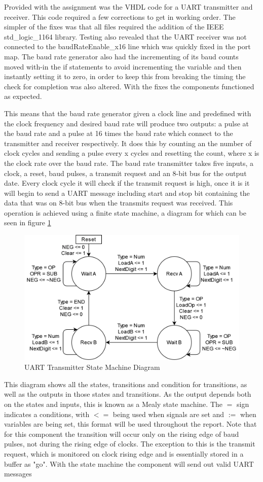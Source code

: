 \documentclass[11pt]{article}
\begin{document}
Provided with the assignment was the VHDL code for a UART transmitter and receiver. 
This code required a few corrections to get in working order. 
The simpler of the fixes was that all files required the addition of the IEEE std\_logic\_1164 library. 
Testing also revealed that the UART receiver was not connected to the baudRateEnable\_x16 line which was quickly fixed in the port map.
The baud rate generator also had the incrementing of its baud counts moved with-in the if statements to avoid incrementing the variable and then instantly setting it to zero, in order to keep this from breaking the timing the check for completion was also altered.
With the fixes the components functioned as expected.

This means that the baud rate generator given a clock line and predefined with the clock frequency and desired baud rate will produce two outputs: a pulse at the baud rate and a pulse at 16 times the baud rate which connect to the transmitter and receiver respectively.
It does this by counting an the number of clock cycles and sending a pulse every x cycles and resetting the count, where x is the clock rate over the baud rate.
The baud rate transmitter takes five inputs, a clock, a reset, baud pulses, a transmit request and an 8-bit bus for the output date.
Every clock cycle it will check if the transmit request is high, once it is it will begin to send a UART message including start and stop bit containing the data that was on 8-bit bus when the transmits request was received.
This operation is achieved using a finite state machine, a diagram for which can be seen in figure \ref{fig:transmitsm}

\begin{figure}[H]        
    \centering
    \includegraphics[width=.66\textwidth]{DecoderSM.drawio.png}
    \caption{UART Transmitter State Machine Diagram}
    \label{fig:transmitsm}
\end{figure} 

This diagram shows all the states, transitions and condition for transitions, as well as the outputs in those states and transitions. 
As the output depends both on the states and inputs, this is known as a Mealy state machine.
The $=$ sign indicates a conditions, with $<=$ being used when signals are set and $:=$ when variables are being set, this format will be used throughout the report.
Note that for this component the transition will occur only on the rising edge of baud pulses, not during the rising edge of clocks. 
The exception to this is the transmit request, which is monitored on clock rising edge and is essentially stored in a buffer as "go".
With the state machine the component will send out valid UART messages
\end{document}
